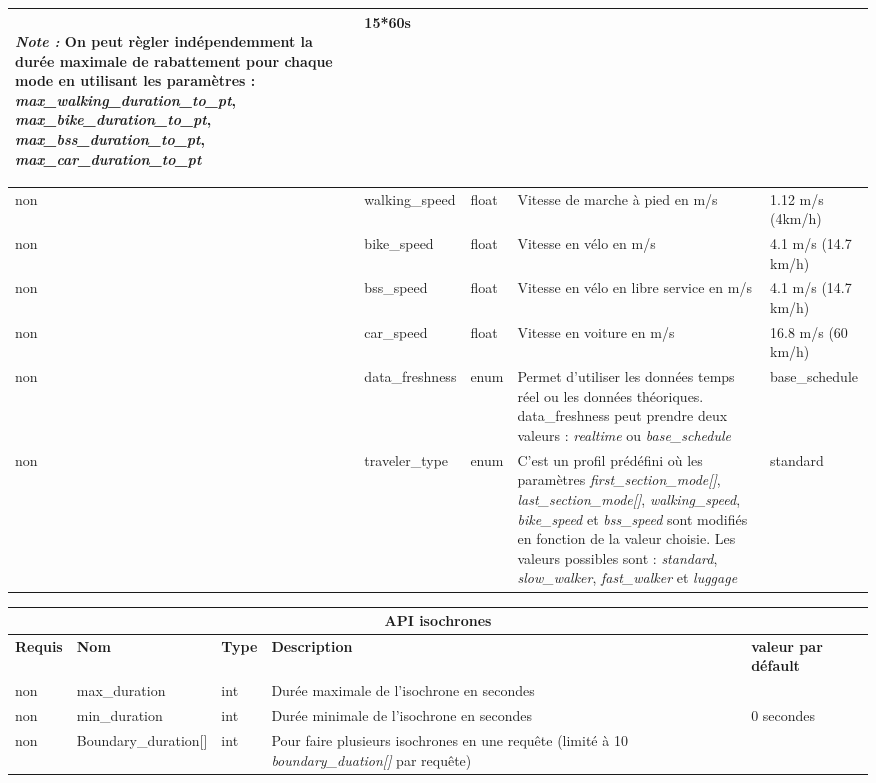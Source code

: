\documentclass[a4paper]{report}
\begin{document}
\begin{center}
\begin{tabular}{|l|l|p{1.5cm}|p{6cm}|l|}
	\paragraph{}\emph{Note :} On peut règler indépendemment la durée maximale de rabattement pour chaque mode en utilisant les paramètres : \emph{max\_walking\_duration\_to\_pt}, \emph{max\_bike\_duration\_to\_pt}, \emph{max\_bss\_duration\_to\_pt}, \emph{max\_car\_duration\_to\_pt} & 15*60s \\
	\hline
	non & walking\_speed & float & Vitesse de marche à pied en m/s & 1.12 m/s (4km/h) \\
	\hline
	non & bike\_speed & float & Vitesse en vélo en m/s & 4.1 m/s (14.7 km/h) \\
	\hline
	non & bss\_speed & float & Vitesse en vélo en libre service en m/s & 4.1 m/s (14.7 km/h) \\
	\hline
	non & car\_speed & float & Vitesse en voiture en m/s & 16.8 m/s (60 km/h) \\
	\hline
	non & data\_freshness & enum & Permet d'utiliser les données temps réel ou les données théoriques. data\_freshness peut prendre deux valeurs : \emph{realtime} ou \emph{base\_schedule} & base\_schedule \\
	\hline
	non & traveler\_type & enum & C'est un profil prédéfini où les paramètres \emph{first\_section\_mode[]}, \emph{last\_section\_mode[]}, \emph{walking\_speed}, \emph{bike\_speed} et \emph{bss\_speed} sont modifiés en fonction de la valeur choisie. Les valeurs possibles sont : \emph{standard}, \emph{slow\_walker}, \emph{fast\_walker} et \emph{luggage} & standard \\
	\hline
	\end{tabular}
\end{center}

\begin{center}
	\begin{tabular}{|l|l|p{1.5cm}|p{6cm}|l|}
	\hline
	\multicolumn{5}{|c|}{\cellcolor{LightCyan} \textbf{API isochrones}} \\
	\hline
	\textbf{Requis} & \textbf{Nom} & \textbf{Type} & \textbf{Description} &  \textbf{valeur par défault} \\
	\hline
	non & max\_duration & int & Durée maximale de l'isochrone en secondes &\\
	\hline
	non & min\_duration & int & Durée minimale de l'isochrone en secondes & 0 secondes\\
	\hline
	non & Boundary\_duration[] & int & Pour faire plusieurs isochrones en une requête (limité à 10 \emph{boundary\_duation[]} par requête) & \\
	\hline
	\end{tabular}
\end{center}
\end{document}
